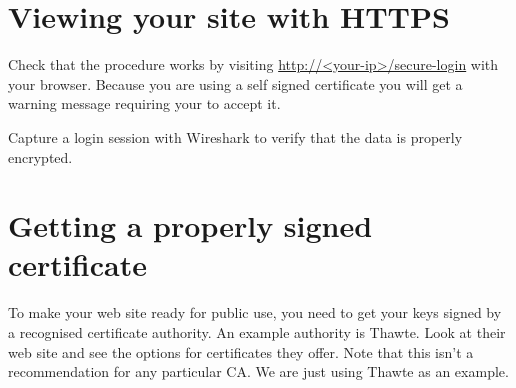 \documentclass{article}
\begin{document}
\section{Viewing your site with HTTPS}
Check that the procedure works by visiting \url{http://<your-ip>/secure-login} with your browser. Because you are using a self signed certificate you will get a warning message requiring your to accept it.

Capture a login session with Wireshark to verify that the data is properly encrypted.

\section{Getting a properly signed certificate}
To make your web site ready for public use, you need to get your keys signed by a recognised certificate authority.  An example authority is Thawte.  Look at their web site and see the options for certificates they offer.  Note that this isn't a recommendation for any particular CA.  We are just using Thawte as an example. 
\end{document}
